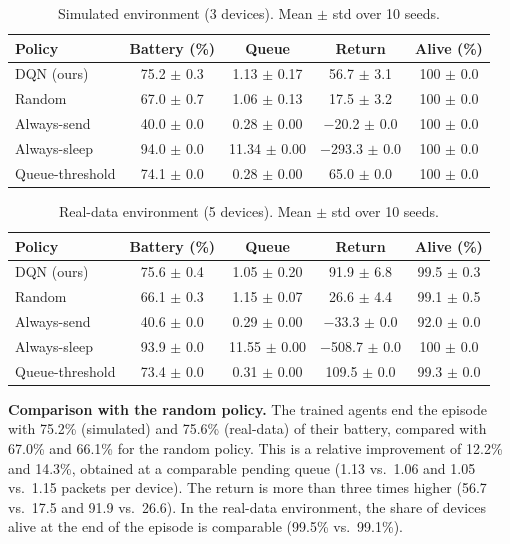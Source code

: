 \documentclass[conference]{IEEEtran}
\begin{document}
\begin{table}[t]
\caption{Simulated environment (3 devices). Mean $\pm$ std over 10 seeds.}
\label{tab:simulated}
\centering\small
\footnotesize
\setlength{\tabcolsep}{2.5pt}
\begin{tabular}{@{}lcccc@{}}
\toprule
Policy & Battery (\%) & Queue & Return & Alive (\%) \\
\midrule
DQN (ours) & 75.2 $\pm$ 0.3 & 1.13 $\pm$ 0.17 & 56.7 $\pm$ 3.1 & 100 $\pm$ 0.0 \\
Random & 67.0 $\pm$ 0.7 & 1.06 $\pm$ 0.13 & 17.5 $\pm$ 3.2 & 100 $\pm$ 0.0 \\
Always-send & 40.0 $\pm$ 0.0 & 0.28 $\pm$ 0.00 & $-$20.2 $\pm$ 0.0 & 100 $\pm$ 0.0 \\
Always-sleep & 94.0 $\pm$ 0.0 & 11.34 $\pm$ 0.00 & $-$293.3 $\pm$ 0.0 & 100 $\pm$ 0.0 \\
Queue-threshold & 74.1 $\pm$ 0.0 & 0.28 $\pm$ 0.00 & 65.0 $\pm$ 0.0 & 100 $\pm$ 0.0 \\
\bottomrule
\end{tabular}
\end{table}

\begin{table}[t]
\caption{Real-data environment (5 devices). Mean $\pm$ std over 10 seeds.}
\label{tab:real}
\centering\small
\footnotesize
\setlength{\tabcolsep}{2.5pt}
\begin{tabular}{@{}lcccc@{}}
\toprule
Policy & Battery (\%) & Queue & Return & Alive (\%) \\
\midrule
DQN (ours) & 75.6 $\pm$ 0.4 & 1.05 $\pm$ 0.20 & 91.9 $\pm$ 6.8 & 99.5 $\pm$ 0.3 \\
Random & 66.1 $\pm$ 0.3 & 1.15 $\pm$ 0.07 & 26.6 $\pm$ 4.4 & 99.1 $\pm$ 0.5 \\
Always-send & 40.6 $\pm$ 0.0 & 0.29 $\pm$ 0.00 & $-$33.3 $\pm$ 0.0 & 92.0 $\pm$ 0.0 \\
Always-sleep & 93.9 $\pm$ 0.0 & 11.55 $\pm$ 0.00 & $-$508.7 $\pm$ 0.0 & 100 $\pm$ 0.0 \\
Queue-threshold & 73.4 $\pm$ 0.0 & 0.31 $\pm$ 0.00 & 109.5 $\pm$ 0.0 & 99.3 $\pm$ 0.0 \\
\bottomrule
\end{tabular}
\end{table}

\textbf{Comparison with the random policy.} The trained agents end the episode with 75.2\% (simulated) and 75.6\% (real-data) of their battery, compared with 67.0\% and 66.1\% for the random policy. This is a relative improvement of 12.2\% and 14.3\%, obtained at a comparable pending queue (1.13 vs.\ 1.06 and 1.05 vs.\ 1.15 packets per device). The return is more than three times higher (56.7 vs.\ 17.5 and 91.9 vs.\ 26.6). In the real-data environment, the share of devices alive at the end of the episode is comparable (99.5\% vs.\ 99.1\%).
\end{document}
